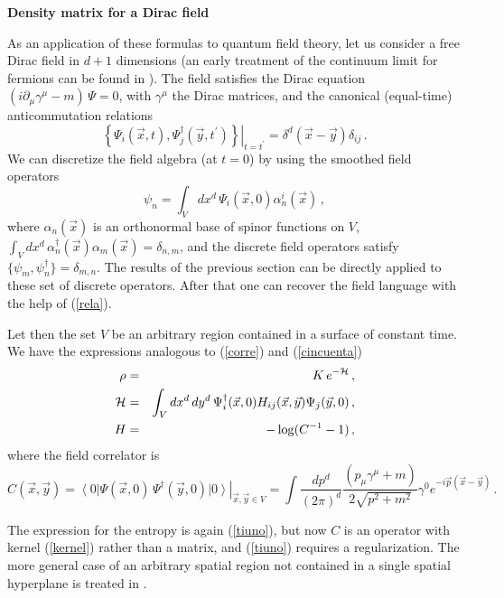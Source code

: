 \documentclass[a4paper]{article}
\begin{document}
\noindent \textbf{Density matrix for a Dirac field}
 
\noindent As an application of these formulas to quantum field theory, let us consider a free Dirac field in $d+1$ dimensions (an early treatment of the continuum limit for fermions can be found in \cite{p1}). The field satisfies the Dirac equation $
(i\partial_\mu \gamma^\mu -m) \, \Psi =0$, 
 with $\gamma^\mu$ the Dirac matrices, and the 
canonical (equal-time) anticommutation relations
\begin{equation}
\left. \left\{\Psi_i(\vec{x},t),\Psi^{\dagger}_j(\vec{y},t^\prime)\right\}\right|_{t=t^\prime}=\delta^d(\vec{x}-\vec{y})\delta_{ij}\,.
\end{equation}
We can discretize the field algebra (at $t=0$) by using the smoothed field operators
\begin{equation}
\psi_{n}=\int_V dx^d\, \Psi_i(\vec{x},0) \alpha^i_n (\vec{x})\,,\label{rela}
\end{equation}  
where $\alpha_n(\vec{x})$ is an orthonormal base of spinor functions on $V$, $
\int_V dx^d\, \alpha_n^\dagger (\vec{x}) \alpha_m (\vec{x})=\delta_{n,m}$, 
and the discrete field operators satisfy $
\{\psi_m,\psi_n^\dagger\}=\delta_{m,n}$.
The results of the previous section can be directly applied to these set of discrete operators. After that one can recover the field language with the help of (\ref{rela}). 

Let then the set $V$ be an arbitrary region contained in a surface of constant time. We have the expressions analogous to (\ref{corre}) and (\ref{cincuenta}) 
\begin{eqnarray}
\rho &=& K\, e^{-{\cal H}}\,, \\
{\cal H}&=&\int_V dx^d\,dy^d \,\Psi_i^{\dagger}(\vec{x},0)H_{ij}(\vec{x},\vec{y}) \Psi_j(\vec{y},0)\,,\label{rho2}\\
H&=&-\log (C^{-1}-1 )\,,
\end{eqnarray}
where the field correlator is 
\begin{equation}
C(\vec{x},\vec{y})=\left. \left\langle0 \right|\Psi(\vec{x},0)\,\Psi^\dagger(\vec{y},0) \left|0\right\rangle \right|_{\vec{x},\vec{y}\in V}=\int \frac{dp^d}{(2\pi)^d}  \frac{(p_\mu \gamma^\mu +m)}{2 \sqrt{p^2+m^2}}\gamma^0 e^{-i \vec{p}(\vec{x}-\vec{y})}\,.
\label{kernel}
\end{equation}


The expression for the entropy is again (\ref{tiuno}), but now $C$ is an operator with kernel (\ref{kernel}) rather than a matrix, and (\ref{tiuno}) requires a regularization. 
 The more general case of an arbitrary spatial region not contained in a single spatial hyperplane is treated in \cite{futuro}.
\end{document}

